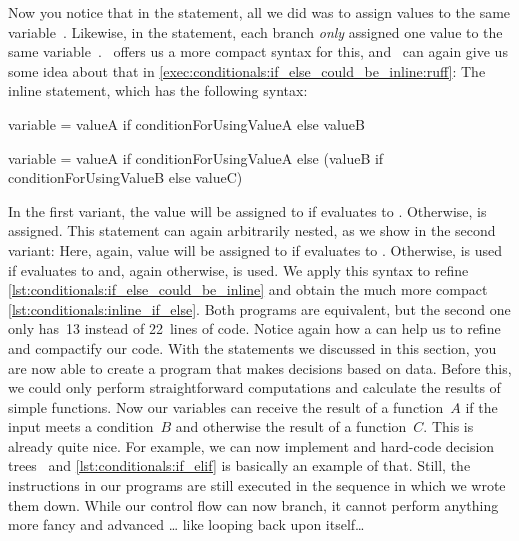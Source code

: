 Now you notice that in the  statement, all we did was to assign values to the same variable~.
Likewise, in the  statement, each branch \emph{only} assigned one value to the same variable~.
\python\ offers us a more compact syntax for this, and \ruff\ can again give us some idea about that in \cref{exec:conditionals:if_else_could_be_inline:ruff}:
The inline  statement, which has the following syntax:%
%
\begin{pythonSyntax}[false]
variable = valueA if conditionForUsingValueA else valueB

variable = valueA if conditionForUsingValueA else (valueB if conditionForUsingValueB else valueC)
\end{pythonSyntax}
%
In the first variant, the value  will be assigned to  if  evaluates to .
Otherwise,  is assigned.
This statement can again arbitrarily nested, as we show in the second variant:
Here, again, value  will be assigned to  if  evaluates to .
Otherwise,  is used if  evaluates to  and, again otherwise,  is used.%
%
%
%
We apply this syntax to refine \cref{lst:conditionals:if_else_could_be_inline} and obtain the much more compact \cref{lst:conditionals:inline_if_else}.
Both programs are equivalent, but the second one only has~13 instead of 22~lines of code.
Notice again how a  can help us to refine and compactify our code.%
%
\endhsection%
%
%
With the statements we discussed in this section, you are now able to create a program that makes decisions based on data.
Before this, we could only perform straightforward computations and calculate the results of simple functions.
Now our variables can receive the result of a function~$A$ if the input meets a condition~$B$ and otherwise the result of a function~$C$.
This is already quite nice.
For example, we can now implement and hard-code decision trees~\cite{RN2022AIAMA,SSBD2014UMLFTTA} and \cref{lst:conditionals:if_elif} is basically an example of that.
Still, the instructions in our programs are still executed in the sequence in which we wrote them down.
While our control flow can now branch, it cannot perform anything more fancy and advanced {\dots} like looping back upon itself\dots%
\endhsection%
%
\FloatBarrier%
\endhsection%
%
